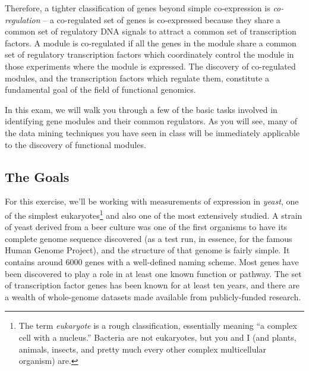 \documentclass{article}
\begin{document}
Therefore, a tighter classification of genes beyond simple co-expression is \emph{co-regulation} -- a co-regulated set of genes is co-expressed because they share a common set of regulatory DNA signals to attract a common set of transcription factors.  
A module is co-regulated if all the genes in the module share a common set of regulatory transcription factors which coordinately control the module in those experiments where the module is expressed. 
The discovery of co-regulated modules, and the transcription factors which regulate them, constitute a fundamental goal of the field of functional genomics.  

In this exam, we will walk you through a few of the basic tasks involved in identifying gene modules and their common regulators.  
As you will see, many of the data mining techniques you have seen in class will be immediately applicable to the discovery of functional modules.

\subsection{The Goals} 

For this exercise, we'll be working with measurements of expression in \emph{yeast}, one of the simplest eukaryotes\footnote{The term \emph{eukaryote} is a rough classification, essentially meaning ``a complex cell with a nucleus.''  Bacteria are not eukaryotes, but you and I (and plants, animals, insects, and pretty much every other complex multicellular organism) are.} and also one of the most extensively studied.  
A strain of yeast derived from a beer culture was one of the first organisms to have its complete genome sequence discovered (as a test run, in essence, for the famous Human Genome Project), and the structure of that genome is fairly simple.  
It contains around 6000 genes with a well-defined naming scheme. Most genes have been discovered to play a role in at least one known function or pathway. 
The set of transcription factor genes has been known for at least ten years, and there are a wealth of whole-genome datasets made available from publicly-funded research.  
\end{document}
